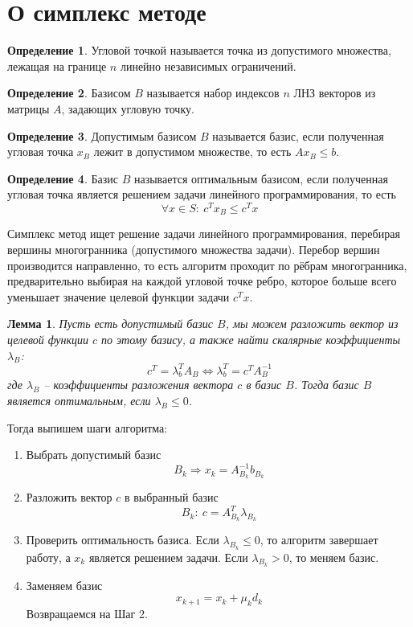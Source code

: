 \documentclass[a4paper,12pt]{article}
\renewcommand{\leq}{\ensuremath{\leqslant}}
\theoremstyle{plain}
\newtheorem{lemma}{Лемма}[section]
\theoremstyle{definition}
\newtheorem{definition}{Определение}[section]
\theoremstyle{remark}
\begin{document}
\section{О симплекс методе}
\begin{definition}
	Угловой точкой называется точка из допустимого множества, лежащая на границе $n$ линейно независимых ограничений.
\end{definition}

\begin{definition}
	Базисом $B$ называется набор индексов $n$ ЛНЗ векторов из матрицы $A$, задающих угловую точку.
\end{definition}

\begin{definition}
	Допустимым базисом $B$ называется базис, если полученная угловая точка $x_B$ лежит в допустимом множестве, то есть $Ax_B \leq b$.
\end{definition}

\begin{definition}
	Базис $B$ называется оптимальным базисом, если полученная угловая точка является решением задачи линейного программирования, то есть
	\[
		\forall x \in S :\: c^Tx_B \leq c^Tx
	\]
\end{definition}

Симплекс метод ищет решение задачи линейного программирования, перебирая вершины многогранника (допустимого множества задачи). Перебор вершин производится направленно, то есть алгоритм проходит по рёбрам многогранника, предварительно выбирая на каждой угловой точке ребро, которое больше всего уменьшает значение целевой функции задачи $c^Tx$.

\begin{lemma}
	Пусть есть допустимый базис $B$, мы можем разложить вектор из целевой функции $c$ по этому базису, а также найти скалярные коэффициенты $\lambda_B$:
	\[
		c^T = \lambda_b^TA_B \Leftrightarrow \lambda_b^T = c^T A_B^{-1}
	\]
	где $\lambda_B$ -- коэффициенты разложения вектора $c$ в базис $B$. Тогда базис $B$ является оптимальным, если $\lambda_B \leq 0$.
\end{lemma}

Тогда выпишем шаги алгоритма:
\begin{enumerate}
	\item Выбрать допустимый базис
	      \[
		      B_k \Rightarrow x_k = A^{-1}_{B_k}b_{B_k}
	      \]
	\item Разложить вектор $c$ в выбранный базис
	      \[
		      B_k :\: c = A^T_{B_k}\lambda_{B_k}
	      \]
	\item Проверить оптимальность базиса. Если $\lambda_{B_k} \leq 0$, то алгоритм завершает работу, а $x_k$ является решением задачи. Если $\lambda_{B_k} > 0$, то меняем базис.
	\item Заменяем базис
	      \[
		      x_{k + 1} = x_k + \mu_kd_k
	      \]
        Возвращаемся на Шаг 2.
\end{enumerate}
\end{document}
